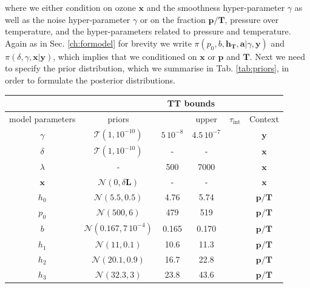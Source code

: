 where we either condition on ozone $\bm{x}$ and the smoothness hyper-parameter $\gamma$ as well as the noise hyper-parameter $\gamma$ or on the fraction $\bm{p}/\bm{T}$, pressure over temperature, and the hyper-parameters related to pressure and temperature.
Again as in Sec. \ref{ch:formodel} for brevity we write $\pi(p_0,b,\bm{h_T},\bm{a}| \gamma,\bm{y}) $ and $\pi(\delta, \gamma, \bm{x}|\bm{y})$, which implies that we conditioned on $\bm{x}$ or $\bm{p}$ and $\bm{T}$. 
Next we need to specify the prior distribution, which we summarise in Tab. \ref{tab:priors}, in order to formulate the posterior distributions.
\begin{table}
	\centering
	\begin{tabular}{ |c||c|c|c|c|c|   }
		\hline
		& &\multicolumn{2}{|c|}{TT bounds}& &\\
		\hline
		model parameters& priors&\makecell{lower}& \makecell{upper\\
		}&$\tau_{\text{int}}$&Context\\
		\hhline{|=||=|=|=|=|=|}
		$\gamma$ & $\mathcal{T}(1,10^{-10})$ &$5 \, 10^{-8}$ &$4.5 \, 10^{-7}$& &$\bm{y}$\\ \hline
		$\delta$ &$\mathcal{T}(1,10^{-10})$ & -&-& & $\bm{x}$\\ \hline
		$\lambda$ &- & 500&7000& &$\bm{x}$\\ \hline
		$\bm{x}$ &$\mathcal{N}(0,\delta \bm{L})$ & -&-&& $\bm{x}$\\ \hhline{|=||=|=|=|=|=|}
		$h_0$ &  $\mathcal{N}(5.5,0.5)$& 4.76&5.74&&$\bm{p/T}$\\ \hline
		$p_0$ &  $\mathcal{N}(500,6)$&479 &519&&$\bm{p/T}$\\ \hline
		$b$ &  $\mathcal{N}(0.167,7\,10^{-4})$& 0.165& 0.170 &&$\bm{p/T}$\\ \hline
		$h_{1}$ &  $\mathcal{N}(11,0.1)$&10.6 &11.3&&$\bm{p/T}$\\ \hline
		$h_{2}$ &  $\mathcal{N}(20.1,0.9)$&16.7 &22.8&&$\bm{p/T}$\\ \hline
		$h_{3}$ &  $\mathcal{N}(32.3,3)$&23.8&43.6&&$\bm{p/T}$\\ \hline

\end{tabular}
\end{table}
